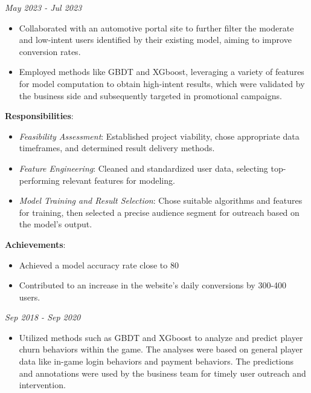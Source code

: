 \documentclass[letterpaper,11pt]{article}
\begin{document}
\vspace{1em}

 \hfill \textit{May 2023 - Jul 2023}
\begin{itemize}
    \item Collaborated with an automotive portal site to further filter the moderate and low-intent users identified by their existing model, aiming to improve conversion rates.
    \item Employed methods like GBDT and XGboost, leveraging a variety of features for model computation to obtain high-intent results, which were validated by the business side and subsequently targeted in promotional campaigns.
\end{itemize}

\textbf{Responsibilities}:
\begin{itemize}
    \item \textit{Feasibility Assessment}: Established project viability, chose appropriate data timeframes, and determined result delivery methods.
    \item \textit{Feature Engineering}: Cleaned and standardized user data, selecting top-performing relevant features for modeling.
    \item \textit{Model Training and Result Selection}: Chose suitable algorithms and features for training, then selected a precise audience segment for outreach based on the model's output.
\end{itemize}

\textbf{Achievements}:
\begin{itemize}
    \item Achieved a model accuracy rate close to 80%
    \item Contributed to an increase in the website's daily conversions by 300-400 users.
\end{itemize}

 \hfill \textit{Sep 2018 - Sep 2020}
\begin{itemize}
    \item Utilized methods such as GBDT and XGboost to analyze and predict player churn behaviors within the game. The analyses were based on general player data like in-game login behaviors and payment behaviors. The predictions and annotations were used by the business team for timely user outreach and intervention.
\end{itemize}
\end{document}
